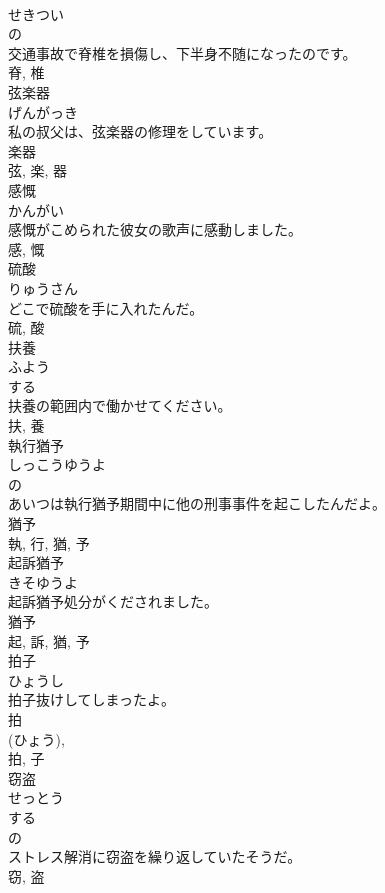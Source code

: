 \documentclass[8pt]{extreport}
\begin{document}
\begin{CJK}{UTF8}{min}
\\	せきつい	
\\	の 
\\	交通事故で脊椎を損傷し、下半身不随になったのです。	
\\	脊, 椎	
\\	弦楽器	
\\	げんがっき	
\\	私の叔父は、弦楽器の修理をしています。	
\\	楽器 
\\	弦, 楽, 器	
\\	感慨	
\\	かんがい	
\\	感慨がこめられた彼女の歌声に感動しました。	
\\	感, 慨	
\\	硫酸	
\\	りゅうさん	
\\	どこで硫酸を手に入れたんだ。	
\\	硫, 酸	
\\	扶養	
\\	ふよう	
\\	する 
\\	扶養の範囲内で働かせてください。	
\\	扶, 養	
\\	執行猶予	
\\	しっこうゆうよ	
\\	の 
\\	あいつは執行猶予期間中に他の刑事事件を起こしたんだよ。	
\\	猶予 
\\	執, 行, 猶, 予	
\\	起訴猶予	
\\	きそゆうよ	
\\	起訴猶予処分がくだされました。	
\\	猶予 
\\	起, 訴, 猶, 予	
\\	拍子	
\\	ひょうし	
\\	拍子抜けしてしまったよ。	
\\	拍 
\\	(ひょう), 
\\	拍, 子	
\\	窃盗	
\\	せっとう	
\\	する 
\\	の 
\\	ストレス解消に窃盗を繰り返していたそうだ。	
\\	窃, 盗	

\end{CJK}
\end{document}
